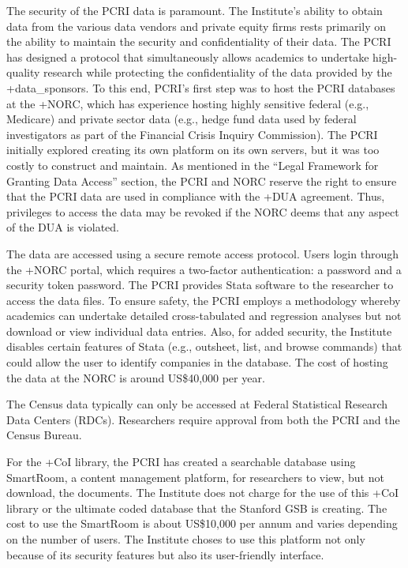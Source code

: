 \documentclass[
]{WileySix}
\begin{document}
The security of the PCRI data is paramount. The Institute's ability to obtain data from the various data vendors and private equity firms rests primarily on the ability to maintain the security and confidentiality of their data. The PCRI has designed a protocol that simultaneously allows academics to undertake high-quality research while protecting the confidentiality of the data provided by the +data\_sponsors\textbar. To this end, PCRI's first step was to host the PCRI databases at the +NORC\textbar, which has experience hosting highly sensitive federal (e.g., Medicare) and private sector data (e.g., hedge fund data used by federal investigators as part of the Financial Crisis Inquiry Commission). The PCRI initially explored creating its own platform on its own servers, but it was too costly to construct and maintain. As mentioned in the ``Legal Framework for Granting Data Access'' section, the PCRI and NORC reserve the right to ensure that the PCRI data are used in compliance with the +DUA\textbar{} agreement. Thus, privileges to access the data may be revoked if the NORC deems that any aspect of the DUA is violated.

The data are accessed using a secure remote access protocol. Users login through the +NORC\textbar{} portal, which requires a two-factor authentication: a password and a security token password. The PCRI provides Stata software to the researcher to access the data files. To ensure safety, the PCRI employs a methodology whereby academics can undertake detailed cross-tabulated and regression analyses but not download or view individual data entries. Also, for added security, the Institute disables certain features of Stata (e.g., outsheet, list, and browse commands) that could allow the user to identify companies in the database. The cost of hosting the data at the NORC is around US\$40,000 per year.

The Census data typically can only be accessed at Federal Statistical Research Data Centers (RDCs). Researchers require approval from both the PCRI and the Census Bureau.

For the +CoI\textbar{} library, the PCRI has created a searchable database using SmartRoom, a content management platform, for researchers to view, but not download, the documents. The Institute does not charge for the use of this +CoI\textbar{} library or the ultimate coded database that the Stanford GSB is creating. The cost to use the SmartRoom is about US\$10,000 per annum and varies depending on the number of users. The Institute choses to use this platform not only because of its security features but also its user-friendly interface.
\end{document}
